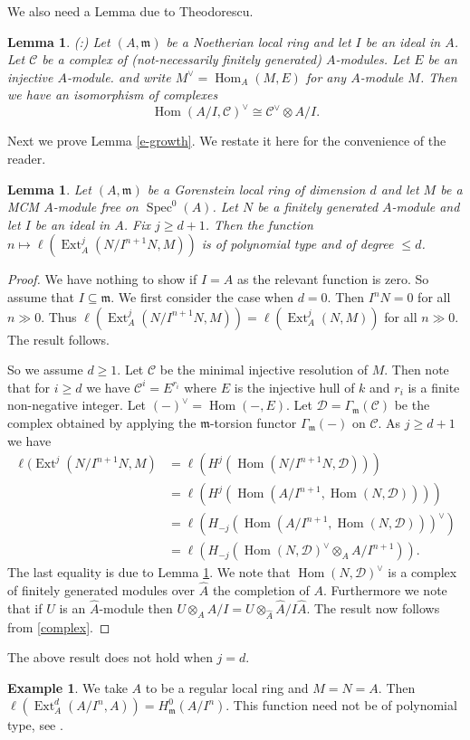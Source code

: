 \documentclass{amsart}
\newcommand{\m}{\mathfrak{m} }
\newcommand{\wh}{\widehat }
\newcommand{\Spec}{\operatorname{Spec}}
\newcommand{\Hom}{\operatorname{Hom}}
\newcommand{\Ext}{\operatorname{Ext}}
\theoremstyle{plain}
\newtheorem{lemma}[theorem]{Lemma}
\theoremstyle{definition}
\newtheorem{example}[theorem]{Example}
\theoremstyle{remark}
\begin{document}
We also need a Lemma due to Theodorescu.
\begin{lemma}\label{vee}(\cite[Lemma 1]{Theo}:)
Let $(A, \m)$ be a Noetherian local ring and let $I$ be an ideal in $A$. Let $\mathcal{C}$ be a complex of (not-necessarily finitely generated) $A$-modules. Let $E$ be an injective $A$-module.
and write $M^\vee = \Hom_A(M, E)$ for any $A$-module $M$. Then we have an isomorphism of complexes
$$ \Hom(A/I, \mathcal{C})^\vee \cong \mathcal{C}^\vee \otimes A/I.$$
\end{lemma}
Next we prove
Lemma \ref{e-growth}. We restate it here for the convenience of the reader.
\begin{lemma}
\label{e-growth-body} Let $(A,\m)$ be a Gorenstein local ring of dimension $d$ and let $M$ be a MCM $A$-module free on $\Spec^0(A)$. Let $N$ be a finitely generated $A$-module and let $I$ be an ideal in $A$. Fix $j \geq d +1$. Then the function $n \mapsto \ell(\Ext^{j}_A( N/I^{n+1}N, M))$ is of polynomial type and of degree $\leq d$.
\end{lemma}
\begin{proof}
We have nothing to show if $I = A$ as the relevant function is zero. So assume that $I \subseteq \m$. We first consider the case when $d = 0$. Then $I^n N = 0$ for all $n \gg 0$.
Thus $\ell(\Ext^{j}_A( N/I^{n+1}N, M)) = \ell(\Ext^j_A(N, M))$ for all $n \gg 0$. The result follows.

So we assume $d \geq 1$. Let $\mathcal{C}$ be the minimal injective resolution of $M$. Then note that for $i \geq d$ we have $\mathcal{C}^i = E^{r_i}$ where $E$ is the injective hull of $k$ and $r_i$ is a finite non-negative integer. Let $(-)^\vee = \Hom(-, E)$.
Let $\mathcal{D} = \Gamma_\m(\mathcal{C})$ be the complex obtained by applying the $\m$-torsion  functor $\Gamma_\m(-)$ on $\mathcal{C}$.
As $j \geq d +1$ we have
\begin{align*}
  \ell(\Ext^j(N/I^{n+1}N, M) &= \ell(H^j(\Hom(N/I^{n+1} N, \mathcal{D}))) \\
  &=  \ell(H^j(\Hom(A/I^{n+1} , \Hom(N,\mathcal{D})))) \\
   &= \ell(H_{-j}(\Hom(A/I^{n+1} , \Hom(N,\mathcal{D})))^\vee) \\
  &= \ell(H_{-j}(\Hom(N, \mathcal{D})^\vee \otimes_A A/I^{n+1})).
\end{align*}
The last equality is due to Lemma \ref{vee}. We note that $\Hom(N, \mathcal{D})^\vee $ is a complex of finitely generated modules over $\wh{A}$ the completion of $A$. Furthermore we note that if $U$ is an $\wh{A}$-module then $U\otimes_A A/I = U\otimes_{\wh{A}}\wh{A}/I\wh{A}$. The result now follows from \ref{complex}.
\end{proof}
The above result does not hold when $j = d$.
\begin{example}
 We take $A$ to be a regular local ring and $M = N = A$. Then $\ell(\Ext^d_A(A/I^n, A)) = H^0_\m(A/I^n)$. This function need not be of polynomial type, see \cite[3.2]{CT}.
\end{example}
\end{document}

